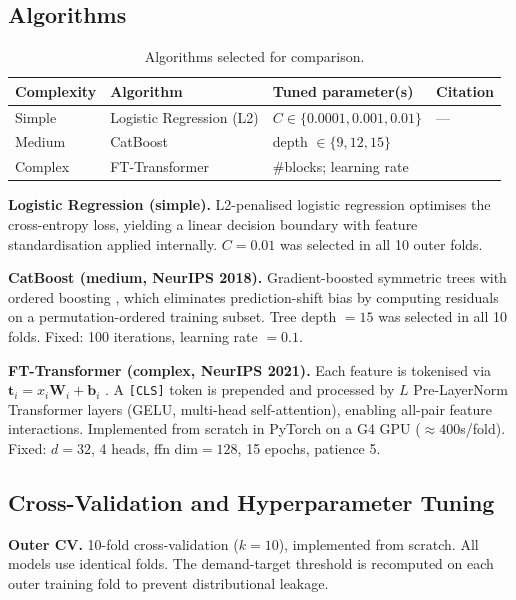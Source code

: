 \documentclass[10pt,a4paper]{article}
\newcommand{\reporttabcolsep}{4pt}
\begin{document}
\subsection{Algorithms}

\begin{table}[H]
\centering\small
\setlength{\tabcolsep}{\reporttabcolsep}
\begin{tabular}{llll}
\toprule
Complexity & Algorithm & Tuned parameter(s) & Citation \\
\midrule
Simple  & Logistic Regression (L2) & $C \in \{0.0001, 0.001, 0.01\}$  & --- \\
Medium  & CatBoost                 & depth $\in \{9, 12, 15\}$         & \cite{prokhorenkova2018} \\
Complex & FT-Transformer           & \#blocks; learning rate            & \cite{gorishniy2021} \\
\bottomrule
\end{tabular}
\caption{Algorithms selected for comparison.}
\label{tab:algorithms}
\end{table}

\textbf{Logistic Regression (simple).}
L2-penalised logistic regression optimises the cross-entropy loss, yielding a
linear decision boundary with feature standardisation applied internally.
$C = 0.01$ was selected in all 10 outer folds.

\textbf{CatBoost (medium, NeurIPS 2018).}
Gradient-boosted symmetric trees with ordered boosting \cite{prokhorenkova2018},
which eliminates prediction-shift bias by computing residuals on a
permutation-ordered training subset. Tree depth $= 15$ was selected in all 10
folds. Fixed: 100 iterations, learning rate $= 0.1$.

\textbf{FT-Transformer (complex, NeurIPS 2021).}
Each feature is tokenised via $\mathbf{t}_i = x_i\mathbf{W}_i + \mathbf{b}_i$
\cite{gorishniy2021}. A \texttt{[CLS]} token is prepended and processed by
$L$ Pre-LayerNorm Transformer layers (GELU, multi-head self-attention), enabling
all-pair feature interactions. Implemented from scratch in PyTorch on a G4 GPU
(${\approx}400$s/fold). Fixed: $d{=}32$, 4 heads, ffn dim$=128$, 15 epochs,
patience 5.

\subsection{Cross-Validation and Hyperparameter Tuning}

\textbf{Outer CV.} 10-fold cross-validation ($k = 10$), implemented from scratch.
All models use identical folds. The demand-target threshold is recomputed on
each outer training fold to prevent distributional leakage.
\end{document}
